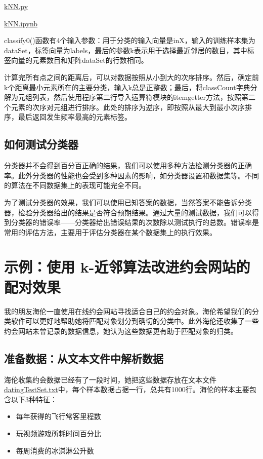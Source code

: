 \begin{tcolorbox}[title=代码清单]
    \href{}{kNN.py}

    \href{}{kNN.ipynb}
\end{tcolorbox}

classify0()函数有4个输入参数：用于分类的输入向量是inX，输入的训练样本集为dataSet，标签向量为labels，最后的参数k表示用于选择最近邻居的数目，其中标签向量的元素数目和矩阵dataSet的行数相同。

计算完所有点之间的距离后，可以对数据按照从小到大的次序排序。然后，确定前k个距离最小元素所在的主要分类，输入k总是正整数；最后，将classCount字典分解为元组列表，然后使用程序第二行导入运算符模块的itemgetter方法，按照第二个元素的次序对元组进行排序。此处的排序为逆序，即按照从最大到最小次序排序，最后返回发生频率最高的元素标签。
\subsection{如何测试分类器}

分类器并不会得到百分百正确的结果，我们可以使用多种方法检测分类器的正确率。此外分类器的性能也会受到多种因素的影响，如分类器设置和数据集等。不同的算法在不同数据集上的表现可能完全不同。

为了测试分类器的效果，我们可以使用已知答案的数据，当然答案不能告诉分类器，检验分类器给出的结果是否符合预期结果。通过大量的测试数据，我们可以得到分类器的错误率——分类器给出错误结果的次数除以测试执行的总数。错误率是常用的评估方法，主要用于评估分类器在某个数据集上的执行效果。


\section{示例：使用 k-近邻算法改进约会网站的配对效果}
我的朋友海伦一直使用在线约会网站寻找适合自己的约会对象。海伦希望我们的分类软件可以更好地帮助她将匹配对象划分到确切的分类中。此外海伦还收集了一些约会网站未曾记录的数据信息，她认为这些数据更有助于匹配对象的归类。
\subsection{准备数据：从文本文件中解析数据}
海伦收集约会数据已经有了一段时间，她把这些数据存放在文本文件\href{}{datingTestSet.txt}中，每个样本数据占据一行，总共有1000行。海伦的样本主要包含以下3种特征：
\begin{itemize}
    \item 每年获得的飞行常客里程数
    \item 玩视频游戏所耗时间百分比
    \item 每周消费的冰淇淋公升数
\end{itemize}


